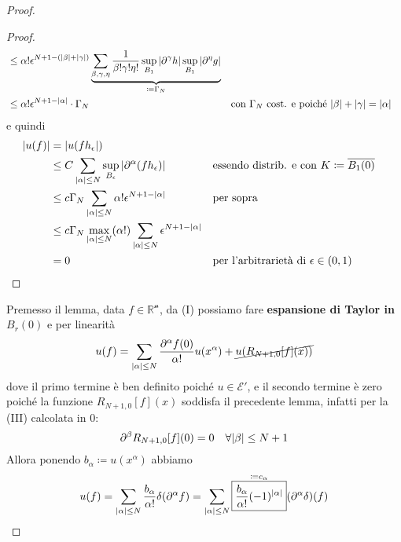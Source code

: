 \documentclass[a4paper,10pt]{article}
\theoremstyle{definition}
\newcommand{\re}{\mathbb{R}} %
\theoremstyle{indentdefinition}
\theoremstyle{indenttheorem}
\theoremstyle{myremark}
\theoremstyle{indentgeneral}
\begin{document}
\begin{proof}
\begin{shaded}
\begin{proof}
\begin{align*}
                &\le \alpha!\epsilon^{N+1-(\abs{\beta}+\abs{\gamma})}\underbrace{\sum_{\beta,\gamma,\eta}\frac{1}{\beta!\gamma!\eta!}\sup_{B_1}\abs{\partial^\gamma h}\sup_{B_1}\abs{\partial^\eta g}}_{\coloneqq \Gamma_N}\\
                &\le\alpha!\epsilon^{N+1-\abs{\alpha}} \cdot\Gamma_N && \text{con $\Gamma_N$ cost. e poiché }\abs{\beta}+\abs{\gamma}=\abs{\alpha}
            \end{align*}
            e quindi
            \begin{align*}
                \abs{u(f)}&=\abs{u(fh_\epsilon})\\
                &\le C\sum_{\abs{\alpha}\le N}\sup_{B_\epsilon}\abs{\partial^\alpha(fh_\epsilon)} && \text{essendo distrib. e con $K\coloneqq \overline{B_1(0)}$}\\
                &\le c\Gamma_N\sum_{\abs{\alpha}\le N}\alpha!\epsilon^{N+1-\abs{\alpha}} && \text{per sopra}\\
                &\le c\Gamma_N\max_{\abs{\alpha}\le N}(\alpha!)\sum_{\abs{\alpha}\le N}\epsilon^{N+1-\abs{\alpha}}\\
                &=0 && \text{per l'arbitrarietà di }\epsilon\in(0,1)
            \end{align*}
        \end{proof}
    \end{shaded}
    \noindent Premesso il lemma, data $f\in\mathcal{\re^n}$, da (I) possiamo fare\textbf{ espansione di Taylor in $B_r(0)$} e per linearità
    $$u(f)=\sum_{\abs{\alpha}\le N}\frac{\partial^\alpha f(0)}{\alpha!}u(x^\alpha)+\cancel{u(R_{N+1,0}[f](x))}$$
    dove il primo termine è ben definito poiché $u\in \mathcal{E}'$, e il secondo termine è zero poiché la funzione $R_{N+1,0}[f](x)$ soddisfa il precedente lemma, infatti per la (III) calcolata in 0: $$\partial^\beta R_{N+1,0}[f](0)=0\quad \forall \abs{\beta}\le N+1$$
    Allora ponendo $b_\alpha\coloneqq u(x^\alpha)$ abbiamo
    $$u(f)=\sum_{\abs{\alpha}\le N}\frac{b_\alpha}{\alpha!}\delta(\partial^\alpha f)=\sum_{\abs{\alpha}\le N}\overset{\coloneqq c_\alpha}{\boxed{\frac{b_\alpha}{\alpha!}(-1)^{\abs{\alpha}}}}(\partial^\alpha\delta)(f)$$
\end{proof}
\end{document}
